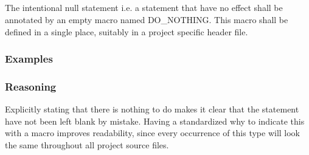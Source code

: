 \subsection*{\codingRule{}}

The intentional null statement i.e. a statement that have no effect shall be annotated by an empty macro named DO\_NOTHING. This macro shall be defined in a single place, suitably in a project specific header file.

\subsubsection*{Examples}

\begin{minipage}[t]{\codelstwidth\linewidth}
    
\end{minipage}
\hfill
\begin{minipage}[t]{\codelstwidth\linewidth}
    
\end{minipage}

\subsubsection*{Reasoning}

Explicitly stating that there is nothing to do makes it clear that the statement have not been left blank by mistake. Having a standardized why to indicate this with a macro improves readability, since every occurrence of this type will look the same throughout all project source files.